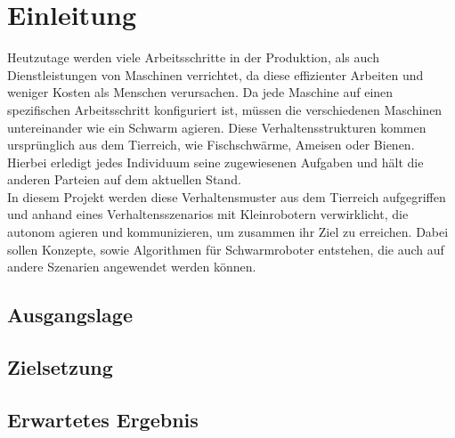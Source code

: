 \setcounter{page}{1}
\ofoot{\pagemark}

\section{Einleitung}

Heutzutage werden viele Arbeitsschritte in der Produktion, als auch Dienstleistungen von Maschinen verrichtet, da diese effizienter Arbeiten und weniger Kosten als Menschen verursachen. Da jede Maschine auf einen spezifischen Arbeitsschritt konfiguriert ist, müssen die verschiedenen Maschinen untereinander wie ein Schwarm agieren. Diese Verhaltensstrukturen kommen ursprünglich aus dem Tierreich, wie Fischschwärme, Ameisen oder Bienen. Hierbei erledigt jedes Individuum seine zugewiesenen Aufgaben und hält die anderen Parteien auf dem aktuellen Stand.\\
In diesem Projekt werden diese Verhaltensmuster aus dem Tierreich aufgegriffen und anhand eines Verhaltensszenarios mit Kleinrobotern verwirklicht, die autonom agieren und kommunizieren, um zusammen ihr Ziel zu erreichen. Dabei sollen Konzepte, sowie Algorithmen für Schwarmroboter entstehen, die auch auf andere Szenarien angewendet werden können.\\

\subsection{Ausgangslage}
\subsection{Zielsetzung}
\subsection{Erwartetes Ergebnis}